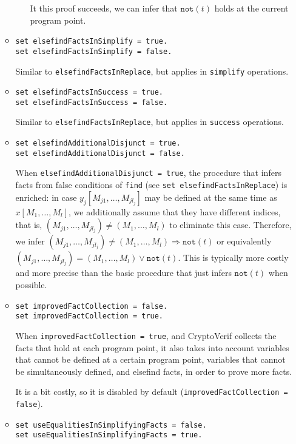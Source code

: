 \begin{itemize}
\begin{itemize}
\begin{itemize}
It this proof succeeds, we can infer that $\texttt{not}(t)$ holds
at the current program point.
\end{itemize}

\item \texttt{set elsefindFactsInSimplify = true.}\\
\texttt{set elsefindFactsInSimplify = false.}

Similar to \texttt{elsefindFactsInReplace}, but applies in
\texttt{simplify} operations. 

\item \texttt{set elsefindFactsInSuccess = true.}\\
\texttt{set elsefindFactsInSuccess = false.}

Similar to \texttt{elsefindFactsInReplace}, but applies in
\texttt{success} operations. 

\item \texttt{set elsefindAdditionalDisjunct = true.}\\
\texttt{set elsefindAdditionalDisjunct = false.}

When \texttt{elsefindAdditionalDisjunct = true}, the procedure that infers facts
from false conditions of \texttt{find} (see \texttt{set elsefindFactsInReplace})
is enriched: in case $y_j[M_{j1}, \ldots, M_{jl_j}]$ may be defined
at the same time as $x[M_1, \ldots, M_l]$, we additionally assume
that they have different indices, that is, $(M_{j1}, \ldots, M_{jl_j}) \neq (M_1, \ldots, M_l)$
to eliminate this case. Therefore, we infer 
$(M_{j1}, \ldots, M_{jl_j}) \neq (M_1, \ldots, M_l) \Rightarrow \texttt{not}(t)$
or equivalently $(M_{j1}, \ldots, M_{jl_j}) = (M_1, \ldots, M_l) \vee \texttt{not}(t)$.
This is typically more costly and more precise than the basic 
procedure that just infers $\texttt{not}(t)$ when possible.

\item \texttt{set improvedFactCollection = false.}\\
\texttt{set improvedFactCollection = true.}

When \texttt{improvedFactCollection = true}, and CryptoVerif collects
the facts that hold at each program point, it also takes into account
variables that cannot be defined at a certain program point, variables
that cannot be simultaneously defined, and elsefind facts, in order to
prove more facts.

It is a bit costly, so it is disabled by default
(\texttt{improvedFactCollection = false}).

\item \texttt{set useEqualitiesInSimplifyingFacts = false.}\\
\texttt{set useEqualitiesInSimplifyingFacts = true.}


\end{itemize}
\end{itemize}

